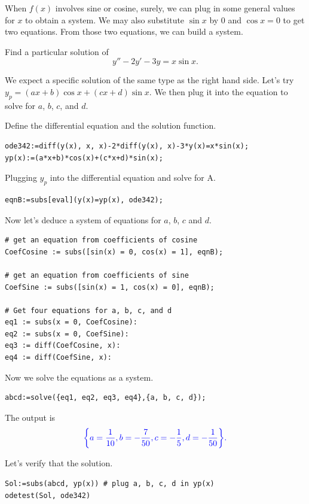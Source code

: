 \documentclass[
  12pt]{elegantbook}
\begin{document}
When \(f(x)\) involves sine or cosine, surely, we can plug in some general values for \(x\) to obtain a system. We may also substitute \(\sin x\) by \(0\) and \(\cos x=0\) to get two equations. From those two equations, we can build a system.

\begin{example}
Find a particular solution of
\[y''- 2y'-3y=x\sin x.\]
\end{example}

\begin{solution}

We expect a specific solution of the same type as the right hand side. Let's try \(y_p=(ax+b)\cos x+(cx+d)\sin x\). We then plug it into the equation to solve for \(a\), \(b\), \(c\), and \(d\).

Define the differential equation and the solution function.

\begin{verbatim}
ode342:=diff(y(x), x, x)-2*diff(y(x), x)-3*y(x)=x*sin(x);
yp(x):=(a*x+b)*cos(x)+(c*x+d)*sin(x);
\end{verbatim}

Plugging \(y_p\) into the differential equation and solve for A.

\begin{verbatim}
eqnB:=subs[eval](y(x)=yp(x), ode342);
\end{verbatim}

Now let's deduce a system of equations for \(a\), \(b\), \(c\) and \(d\).

\begin{verbatim}
# get an equation from coefficients of cosine
CoefCosine := subs([sin(x) = 0, cos(x) = 1], eqnB);

# get an equation from coefficients of sine
CoefSine := subs([sin(x) = 1, cos(x) = 0], eqnB);

# Get four equations for a, b, c, and d
eq1 := subs(x = 0, CoefCosine):
eq2 := subs(x = 0, CoefSine):
eq3 := diff(CoefCosine, x): 
eq4 := diff(CoefSine, x): 
\end{verbatim}

Now we solve the equations as a system.

\begin{verbatim}
abcd:=solve({eq1, eq2, eq3, eq4},{a, b, c, d});
\end{verbatim}

The output is
\[\color{blue}{\left\{a = \frac{1}{10}, b = -\frac{7}{50}, c = -\frac{1}{5}, d
 = -\frac{1}{50}\right\}
}.\]

Let's verify that the solution.

\begin{verbatim}
Sol:=subs(abcd, yp(x)) # plug a, b, c, d in yp(x)
odetest(Sol, ode342)
\end{verbatim}

\end{solution}
\end{document}
